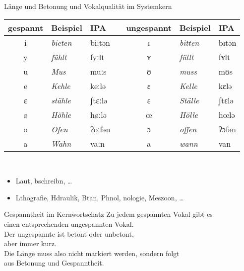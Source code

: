\begin{frame}
  {Länge und Betonung und Vokalqualität im Systemkern}
  \pause
  \centering
  \begin{tabular}{cllp{0.25cm}cll}
    \toprule
    \textbf{gespannt} & \textbf{Beispiel} & \textbf{IPA} & & \textbf{ungespannt} & \textbf{Beispiel} & \textbf{IPA} \\
    \midrule
    i  & \textit{bieten} & biːtən && ɪ & \textit{bitten}  & bɪtən   \\
    y  & \textit{fühlt}  & fyːlt  && ʏ & \textit{füllt}   & fʏlt    \\
    u  & \textit{Mus}    & muːs   && ʊ & \textit{muss}    & mʊs     \\
    e  & \textit{Kehle}  & keːlə  && ɛ & \textit{Kelle}   & kɛlə    \\
    ɛ  & \textit{stähle} & ʃtɛːlə && ɛ & \textit{Ställe}  & ʃtɛlə   \\
    ø  & \textit{Höhle}  & høːlə  && œ & \textit{Hölle}   & hœlə \\
    o  & \textit{Ofen}   & ʔoːfən && ɔ & \textit{offen}   & ʔɔfən   \\
    a  & \textit{Wahn}   & vaːn   && a & \textit{wann}    & van     \\
    \bottomrule
  \end{tabular}\\
  \pause
  \Zeile
  \begin{itemize}[<+->]
    \item Laut, bschreibn, \dots
    \item Lthografie, Hdraulik, Btan, Phnol, nologie, Meszoon, \dots
  \end{itemize}
\end{frame}

\begin{frame}
  {Gespanntheit im Kernwortschatz}
  \pause
  \Large
   Zu jedem gespannten Vokal gibt es\\
  einen entsprechenden ungespannten Vokal.\\
  Der ungespannte ist betont oder unbetont,\\
  aber immer kurz.\\
  \Zeile
  \pause
  Die Länge muss also nicht markiert werden, sondern folgt\\
  aus Betonung und Gespanntheit.
\end{frame}

